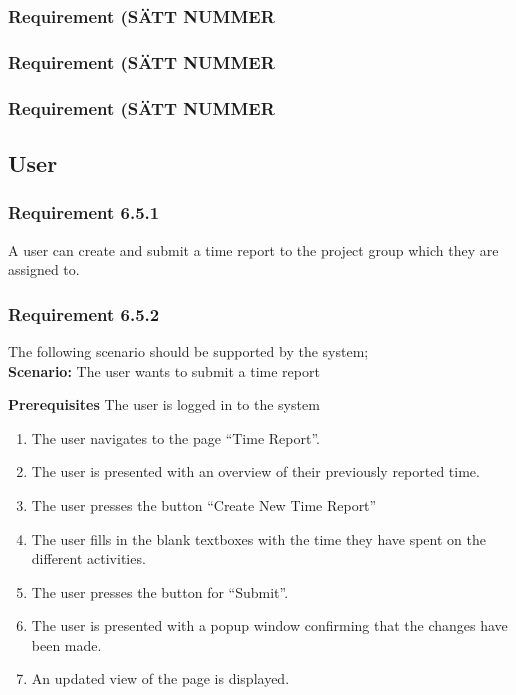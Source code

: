 \documentclass{article}
\begin{document}
\subsubsection{Requirement (SÄTT NUMMER}
\subsubsection{Requirement (SÄTT NUMMER}
\subsubsection{Requirement (SÄTT NUMMER} 

\subsection{User}
\subsubsection{Requirement 6.5.1}
A user can create and submit a time report to the project group which they are assigned to.
\subsubsection{Requirement 6.5.2}
The following scenario should be supported by the system;\\

\textbf{Scenario:} The user wants to submit a time report

\textbf{Prerequisites} The user is logged in to the system

\begin{enumerate}


\item The user navigates to the page “Time Report”. 
\item The user is presented with an overview of their previously reported time. 
\item The user presses the button “Create New Time Report”
\item The user fills in the blank textboxes with the time they have spent on the different activities.
\item The user presses the button for “Submit”.
\item The user is presented with a popup window confirming that the changes have been made.
\item An updated view of the page is displayed.
\end{enumerate}
\end{document}
